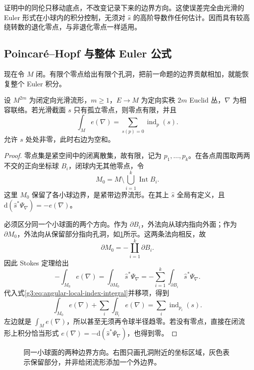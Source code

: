 证明中的同伦只移动底点，不改变记录下来的边界方向。这使误差完全由光滑的 Euler 形式在小球内的积分控制，无须对 \(\widehat s\) 的高阶导数作任何估计。因而具有较高绕转数的退化零点，与非退化零点一样适用。

\subsection{Poincaré–Hopf 与整体 Euler 公式}
\label{g3:subsec:1702:05}
现在令 \(M\) 闭。有限个零点给出有限个孔洞，把前一命题的边界贡献相加，就能恢复整个 Euler 积分。

\begin{theorem}\label{g3:thm:euler-form-index-sum}
	设 \(M^{2m}\) 为闭定向光滑流形，\(m\ge1\)，\(E\to M\) 为定向实秩 \(2m\) Euclid 丛，\(\nabla\) 为相容联络。若光滑截面 \(s\) 只有孤立零点，则零点有限，并且
	\begin{equation}\label{g3:eq:euler-form-index-sum}
		\int_Me(\nabla)=\sum_{s(p)=0}\operatorname{ind}_p(s).
	\end{equation}
	允许 \(s\) 处处非零，此时右边为空和。
\end{theorem}
\begin{proof}
	零点集是紧空间中的闭离散集，故有限，记为 \(p_1,\ldots,p_k\)。在各点周围取两两不交的正向坐标球 \(B_i\)，闭球内无其他零点，令
	\[
		M_0=M\setminus\bigcup_{i=1}^k\operatorname{Int}B_i.
	\]
	这里 \(M_0\) 保留了各小球边界，是紧带边界流形。在其上 \(\widehat s\) 全局有定义，且
	\(\mathrm d(\widehat s^*\Psi_\nabla)=-e(\nabla)\)。

	必须区分同一个小球面的两个方向。作为 \(\partial B_i\)，外法向从球内指向外面；作为 \(\partial M_0\)，外法向从保留部分指向孔洞，如\cref{g3:fig:puncture-orientation}所示。这两条法向相反，故
	\[
		\partial M_0=-\coprod_{i=1}^k\partial B_i.
	\]
	因此 Stokes 定理给出
	\[
		-\int_{M_0}e(\nabla)
		=\int_{\partial M_0}\widehat s^*\Psi_\nabla
		=-\sum_{i=1}^k\int_{\partial B_i}\widehat s^*\Psi_\nabla.
	\]
	代入式\eqref{g3:eq:angular-local-index-integral}并移项，得到
	\[
		\int_{M_0}e(\nabla)+\sum_i\int_{B_i}e(\nabla)
		=\sum_i\operatorname{ind}_{p_i}(s).
	\]
	左边就是 \(\int_Me(\nabla)\)，所以甚至无须再令球半径趋零。若没有零点，直接在闭流形上积分恰当形式
	\(e(\nabla)=-\mathrm d(\widehat s^*\Psi_\nabla)\)，也得到零。
\end{proof}

\begin{figure}[htbp]
	\centering
	
	\caption{同一小球面的两种边界方向。右图只画孔洞附近的坐标区域，灰色表示保留部分，并非给闭流形添加一个外边界。}
	\label{g3:fig:puncture-orientation}
\end{figure}

